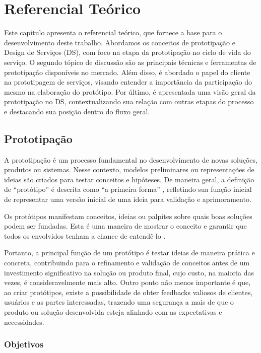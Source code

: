\chapter[Referencial teórico]{Referencial Teórico}

Este capítulo apresenta o referencial teórico, que fornece a base para o desenvolvimento deste trabalho. Abordamos os conceitos de prototipação e Design de Serviços (DS), com foco na etapa da prototipação no ciclo de vida do serviço. O segundo tópico de discussão são as principais técnicas e ferramentas de prototipação disponíveis no mercado. Além disso, é abordado o papel do cliente na prototipagem de serviços, visando entender a importância da participação do mesmo na elaboração do protótipo. Por último, é apresentada uma visão geral da prototipação no DS, contextualizando sua relação com outras etapas do processo e destacando sua posição dentro do fluxo geral.

\section{Prototipação}

A prototipação é um processo fundamental no desenvolvimento de novas soluções, produtos ou sistemas. Nesse contexto, modelos preliminares ou representações de ideias são criados para testar conceitos e hipóteses. De maneira geral, a definição de ``protótipo'' é descrita como ``a primeira forma'' \cite{Blomkvist2011existing}, refletindo sua função inicial de representar uma versão inicial de uma ideia para validação e aprimoramento.

Os protótipos manifestam conceitos, ideias ou palpites sobre quais boas soluções podem ser fundadas. Esta é uma maneira de mostrar o conceito e garantir que todos os envolvidos tenham a chance de entendê-lo \cite{Blomkvist2014}.

Portanto, a principal função de um protótipo é testar ideias de maneira prática e concreta, contribuindo para o refinamento e validação de conceitos antes de um investimento significativo na solução ou produto final, cujo custo, na maioria das vezes, é consideravelmente mais alto. Outro ponto não menos importante é que, ao criar protótipos, existe a possibilidade de obter feedbacks valiosos de clientes, usuários e as partes interessadas, trazendo uma segurança a mais de que o produto ou solução desenvolvida esteja alinhado com as expectativas e necessidades.

\subsection{Objetivos}

